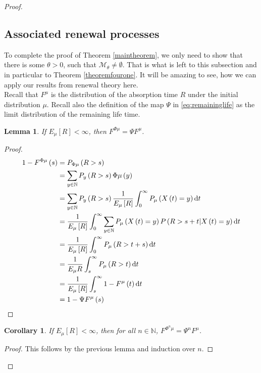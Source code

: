 \documentclass[12pt,a4paper]{scrartcl}
\newtheorem{lemma}[theorem]{Lemma}
\newtheorem{corollary}[theorem]{Corollary}
\numberwithin{equation}{section}
\newcommand{\N}{\mathbb{N}} %
\begin{document}
\begin{proof}
\subsection{Associated renewal processes}

To complete the proof of Theorem \ref{maintheorem}, we only need to show that there is some $\theta > 0$, such that $\mathcal{M}_{\theta} \neq \emptyset.$ That is what is left to this subsection and in particular to Theorem \ref{theoremfourone}. It will be amazing to see, how we can apply our results from renewal theory here. \\[2ex]

Recall that $F^{\mu}$ is the distribution of the absorption time $R$ under the initial distribution $ \mu $. Recall also the definition of the map $ \Psi $ in \eqref{eq:remaininglife} as the limit distribution of the remaining life time.

\begin{lemma}
If $ E_{\mu} \left[R\right] < \infty $, then $ F^{\Phi\mu} = \Psi F^{\mu} $.
\end{lemma}

\begin{proof}
\begin{equation}
\label{eq:somecalculation}
\begin{aligned}
1 - F^{\Phi\mu}\left(s\right) &=
P_{\Phi\mu}\left(R>s\right) \\
&= \sum_{y \in \N} P_y\left(R > s \right) \Phi\mu\left(y\right)  \\
&= \sum_{y \in \N} P_y\left(R > s \right) \frac{1}{E_{\mu}\left[R\right]} \int_0^\infty P_{\mu}\left(X\left(t\right) = y\right) \textnormal{d}t \\
&= \frac{1}{E_{\mu}\left[R\right]} \int_0^\infty \sum_{y \in \N} P_{\mu}\left(X\left(t\right) = y\right) P\left(R > s + t | X\left(t\right) = y \right) \textnormal{d}t \\
&= \frac{1}{E_{\mu}\left[R\right]} \int_0^\infty P_{\mu}\left(R > t+s\right) \textnormal{d}t \\
&= \frac{1}{E_{\mu} R} \int_s^{\infty} P_{\mu}\left(R > t\right) \textnormal{d}t \\
& = \frac{1}{E_{\mu}\left[R\right]} \int_s^\infty 1 - F^{\mu}\left(t\right) \textnormal{d}t \\
 &= 1 - \Psi F^{\mu}\left(s\right)
\end{aligned}
\end{equation}
\end{proof}

\begin{corollary} \label{corlinktorenewal}
If $ E_{\mu} \left[R\right] < \infty $, then for all $n \in \N$, $ F^{\Phi^n\mu} = \Psi^n F^{\mu} $.
\end{corollary}
\begin{proof}
This follows by the previous lemma and induction over $n$.
\end{proof}


\end{proof}
\end{document}
